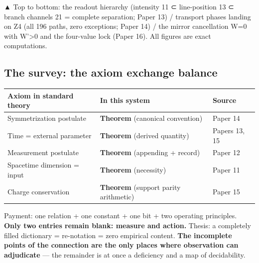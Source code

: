 \documentclass[
  10pt,
]{article}
\newcounter{none} %
\begin{document}
▲ Top to bottom: the readout hierarchy (intensity 11 ⊂ line-position 13
⊂ branch channels 21 = complete separation; Paper 13) / transport phases
landing on Z4 (all 196 paths, zero exceptions; Paper 14) / the mirror
cancellation W=0 with W'\textgreater0 and the four-value lock (Paper
16). All figures are exact computations.

\subsection{The survey: the axiom exchange
balance}\label{the-survey-the-axiom-exchange-balance}

{\def\LTcaptype{none} %
\begin{longtable}[]{@{}
  >{\raggedright\arraybackslash}p{}
  >{\raggedright\arraybackslash}p{}
  >{\raggedright\arraybackslash}p{}@{}}
\toprule\noalign{}
\begin{minipage}[b]{\linewidth}\raggedright
Axiom in standard theory
\end{minipage} & \begin{minipage}[b]{\linewidth}\raggedright
In this system
\end{minipage} & \begin{minipage}[b]{\linewidth}\raggedright
Source
\end{minipage} \\
\midrule\noalign{}
\endhead
\bottomrule\noalign{}
\endlastfoot
Symmetrization postulate & \textbf{Theorem} (canonical convention) &
Paper 14 \\
Time = external parameter & \textbf{Theorem} (derived quantity) & Papers
13, 15 \\
Measurement postulate & \textbf{Theorem} (appending + record) & Paper
12 \\
Spacetime dimension = input & \textbf{Theorem} (necessity) & Paper 11 \\
Charge conservation & \textbf{Theorem} (support parity arithmetic) &
Paper 15 \\
\end{longtable}
}

Payment: one relation + one constant + one bit + two operating
principles. \textbf{Only two entries remain blank: measure and action.}
Thesis: a completely filled dictionary = re-notation = zero empirical
content. \textbf{The incomplete points of the connection are the only
places where observation can adjudicate} --- the remainder is at once a
deficiency and a map of decidability.
\end{document}
